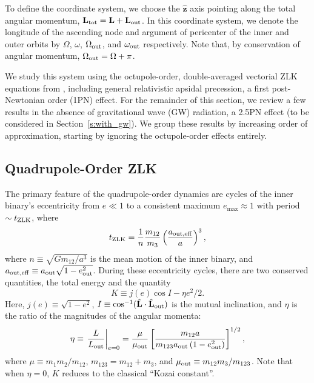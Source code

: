 \documentclass[
        fleqn,
        usenatbib,
    ]{mnras}
\newcommand*{\at}[1]{\left.#1\right|}
\newcommand*{\p}[1]{\left(#1\right)}
\newcommand*{\s}[1]{\left[#1\right]}
\newcommand*{\bm}[1]{\mathbf{#1}}
\newcommand*{\uv}[1]{\hat{\mathbf{#1}}}
\begin{document}
To define the coordinate system, we choose the $\uv{z}$ axis pointing along the
total angular momentum, $\bm{L}_{\rm tot} = \bm{L} + \bm{L}_{\rm out}$. In this
coordinate system, we denote the longitude of the ascending node and argument of
pericenter of the inner and outer orbits by $\Omega$, $\omega$, $\Omega_{\rm
out}$, and $\omega_{\rm out}$ respectively. Note that, by conservation of
angular momentum, $\Omega_{\rm out} = \Omega + \pi$.

We study this system using the octupole-order, double-averaged vectorial ZLK
equations from \citet{LML15}, including general relativistic apsidal precession,
a first post-Newtonian order (1PN) effect. For the remainder of this section, we
review a few results in the absence of gravitational wave (GW) radiation, a
2.5PN effect (to be considered in Section~\ref{s:with_gw}). We group these
results by increasing order of approximation, starting by ignoring the
octupole-order effects entirely.

\subsection{Quadrupole-Order ZLK}

The primary feature of the quadrupole-order dynamics are cycles of the inner
binary's eccentricity from $e \ll 1$ to a consistent maximum $e_{\max} \approx
1$ with period $\sim t_{\rm ZLK}$, where
\begin{equation}
    t_{\rm ZLK} = \frac{1}{n}\frac{m_{12}}{m_3}
            \p{\frac{a_{\rm out, eff}}{a}}^3,\label{eq:def_tzlk}
\end{equation}
where $n \equiv \sqrt{Gm_{12} / a^3}$ is the mean motion of the inner binary,
and $a_{\rm out, eff} \equiv a_{\rm out}\sqrt{1 - e_{\rm out}^2}$. During these
eccentricity cycles, there are two conserved quantities, the total energy and
the quantity \citep{LML15}
\begin{equation}
    K \equiv j(e) \cos I - \eta e^2 / 2. \label{eq:def_K}
\end{equation}
Here, $j(e) \equiv \sqrt{1 - e^2}$, $I \equiv \cos^{-1}(\uv{L} \cdot
\uv{L}_{\rm out})$ is the mutual inclination, and $\eta$ is the ratio of the
magnitudes of the angular momenta:
\begin{equation}
    \eta \equiv \at{\frac{L}{L_{\rm out}}}_{e = 0}
        = \frac{\mu}{\mu_{\rm out}}\s{\frac{m_{12}a}
            {m_{123}a_{\rm out}\p{1 - e_{\rm out}^2}}}^{1/2},\label{eq:def_eta}
\end{equation}
where $\mu \equiv m_1m_2 / m_{12}$, $m_{123} = m_{12} + m_3$, and $\mu_{\rm out}
\equiv m_{12} m_3 / m_{123}$. Note that when $\eta = 0$, $K$ reduces to the
classical ``Kozai constant''.
\end{document}
